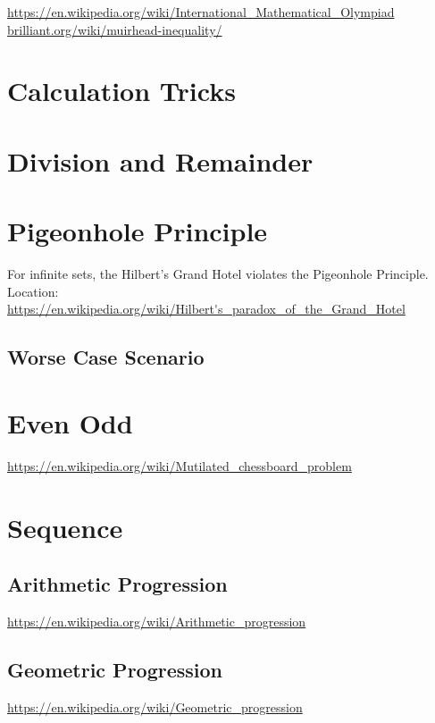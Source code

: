 \url{https://en.wikipedia.org/wiki/International_Mathematical_Olympiad}
\url{brilliant.org/wiki/muirhead-inequality/}

\chapter{Calculation Tricks}
\label{chap:calculation-tricks}


\chapter{Division and Remainder}
\label{chap:division-and-remainder}

\chapter{Pigeonhole Principle}
\label{chap:pigeonhole-principle}

For infinite sets, the Hilbert's Grand Hotel violates the Pigeonhole Principle.
Location: \url{https://en.wikipedia.org/wiki/Hilbert's_paradox_of_the_Grand_Hotel}

\section{Worse Case Scenario}
\label{sec:worst-case-scenario}



\chapter{Even Odd}
\label{chap:even-odd}

\url{https://en.wikipedia.org/wiki/Mutilated_chessboard_problem}

\chapter{Sequence}
\label{chap:sequence}

\section{Arithmetic Progression}
\label{sec:arithmetic-progression}
\url{https://en.wikipedia.org/wiki/Arithmetic_progression}

\section{Geometric Progression}
\label{sec:geometric-progression}
\url{https://en.wikipedia.org/wiki/Geometric_progression}

